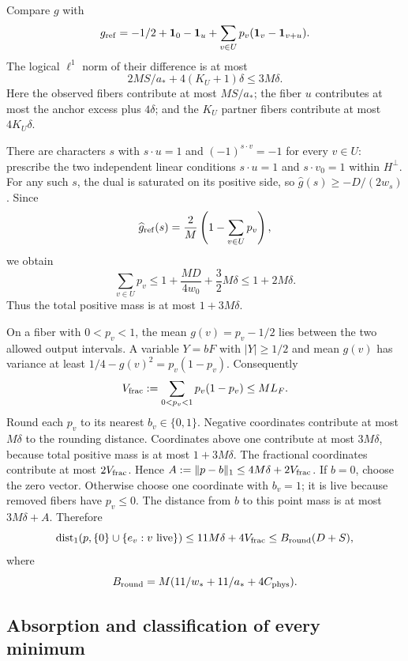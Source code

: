 Compare $g$ with
\[
 g_{\rm ref}=-1/2+\mathbf1_0-\mathbf1_u
              +\sum_{v\in U}p_v(\mathbf1_v-\mathbf1_{v+u}).
\]
The logical $\ell^1$ norm of their difference is at most
\[
 2MS/a_*+4(K_U+1)\delta\le3M\delta.
\]
Here the observed fibers contribute at most $MS/a_*$; the fiber $u$
contributes at most the anchor excess plus $4\delta$; and the $K_U$
partner fibers contribute at most $4K_U\delta$.

There are characters $s$ with $s\cdot u=1$ and
$(-1)^{s\cdot v}=-1$ for every $v\in U$: prescribe the two independent linear conditions
$s\cdot u=1$ and $s\cdot v_0=1$ within $H^\perp$. For any such $s$, the dual is saturated on its
positive side, so $\widehat g(s)\ge-D/(2w_s)$. Since
\[
 \widehat g_{\rm ref}(s)=\frac2M\left(1-\sum_{v\in U}p_v\right),
\]
we obtain
\[
 \sum_{v\in U}p_v\le1+\frac{MD}{4w_0}+\frac32M\delta
 \le1+2M\delta.
\]
Thus the total positive mass is at most $1+3M\delta$.

On a fiber with $0<p_v<1$, the mean $g(v)=p_v-1/2$ lies
between the two allowed output intervals. A variable $Y=bF$ with
$|Y|\ge1/2$ and mean $g(v)$ has variance at least
$1/4-g(v)^2=p_v(1-p_v)$. Consequently
\[
 V_{\rm frac}:=\sum_{0<p_v<1}p_v(1-p_v)\le M L_F.
\]
Round each $p_v$ to its nearest $b_v\in\{0,1\}$. Negative coordinates
contribute at most $M\delta$ to the rounding distance. Coordinates above
one contribute at most $3M\delta$, because total positive mass is at most
$1+3M\delta$. The fractional coordinates contribute at most $2V_{\rm frac}$.
Hence $A:=\|p-b\|_1\le4M\delta+2V_{\rm frac}$.
If $b=0$, choose the zero vector. Otherwise choose one coordinate with
$b_v=1$; it is live because removed fibers have $p_v\le0$. The distance
from $b$ to this point mass is at most $3M\delta+A$. Therefore
\begin{equation}\label{eq:rect-rounding}
 \operatorname{dist}_1(p,\{0\}\cup\{e_v:v\text{ live}\})
 \le11M\delta+4V_{\rm frac}
 \le B_{\rm round}(D+S),
\end{equation}
where
\[
 B_{\rm round}=M(11/w_*+11/a_*+4C_{\rm phys}).
\]

\subsection{Absorption and classification of every minimum}

